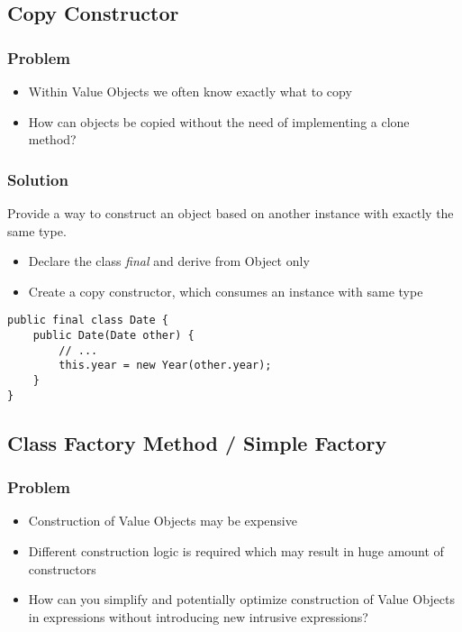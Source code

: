 \subsection{Copy Constructor}
\subsubsection{Problem}
\begin{itemize}
    \item Within Value Objects we often know exactly what to copy
    \item How can objects be copied without the need of implementing a clone method?
\end{itemize}
\subsubsection{Solution}
Provide a way to construct an object based on another instance with exactly the same type.
\begin{itemize}
    \item Declare the class \textit{final} and derive from Object only
    \item Create a copy constructor, which consumes an instance with same type
\end{itemize} 
\begin{lstlisting}
public final class Date {
    public Date(Date other) {
        // ... 
        this.year = new Year(other.year);
    }
}
\end{lstlisting}

\subsection{Class Factory Method / Simple Factory}
\subsubsection{Problem}
\begin{itemize}
    \item Construction of Value Objects may be expensive
    \item Different construction logic is required which may result in huge amount of constructors
    \item How can you simplify and potentially optimize construction of Value Objects in expressions without introducing new intrusive expressions?
\end{itemize}
